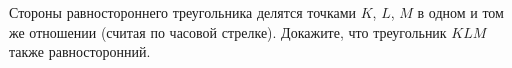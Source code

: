 \begin{ex}
	\begin{condition}
		Стороны  равностороннего  треугольника  делятся  точками \( K \), \( L \), \( M \) в одном и том же отношении (считая по часовой стрелке).  Докажите,  что  треугольник \( KLM\)  также  равносторонний.
	\end{condition}
\end{ex}